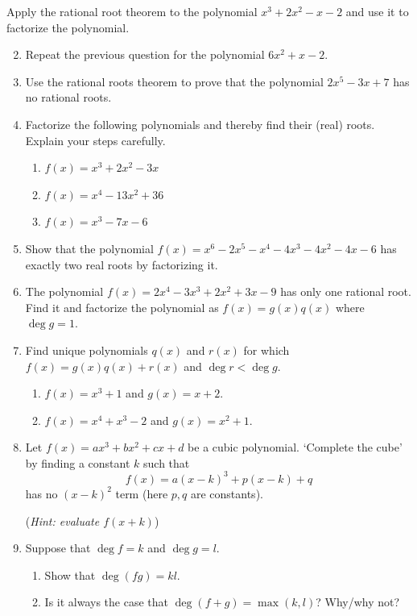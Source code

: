 \begin{exercises}{}{}
\exstart Apply the rational root theorem to the polynomial $x^3+2x^2-x-2$ and use it to factorize the polynomial.
\begin{enumerate}\setcounter{enumi}{1}
  \item Repeat the previous question for the polynomial $6x^2+x-2$.

	\item Use the rational roots theorem to prove that the polynomial $2x^5-3x+7$ has no rational roots.
  
  \item Factorize the following polynomials and thereby find their (real) roots. Explain your steps carefully.
  \begin{enumerate}
    \item $f(x)=x^3+2x^2-3x$ %
    \item $f(x)=x^4-13x^2+36$ %
    \item $f(x)=x^3-7x-6$ %
  \end{enumerate}
  
  
  \item Show that the polynomial $f(x)=x^6-2x^5-x^4-4x^3-4x^2-4x-6$ %
  has exactly two real roots by factorizing it.
	
	\item The polynomial $f(x)=2x^4-3x^3+2x^2+3x-9$ has only one rational root. Find it and factorize the polynomial as $f(x)=g(x)q(x)$ where $\deg g=1$.
	
	
	\item Find unique polynomials $q(x)$ and $r(x)$ for which $f(x)=g(x)q(x)+r(x)$ and $\deg r<\deg g$.
	\begin{enumerate}
	  \item $f(x)=x^3+1$ and $g(x)=x+2$.
	  \item	$f(x)=x^4+x^3-2$ and $g(x)=x^2+1$.
	\end{enumerate}  

  \item Let $f(x)=ax^3+bx^2+cx+d$ be a cubic polynomial. `Complete the cube' by finding a constant $k$ such that
  \[f(x)=a(x-k)^3+p(x-k)+q\]
  has no $(x-k)^2$ term (here $p,q$ are constants).\par
  (\emph{Hint: evaluate $f(x+k)$})
  
  \item Suppose that $\deg f=k$ and $\deg g=l$.
  \begin{enumerate}
    \item Show that $\deg(fg)=kl$.
    \item Is it always the case that $\deg(f+g)=\max(k,l)$? Why/why not?
  \end{enumerate}
\end{enumerate}
\end{exercises}

